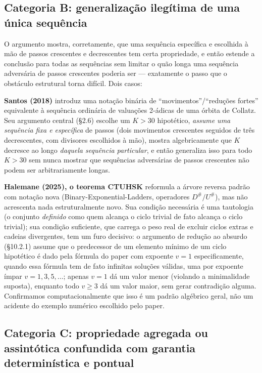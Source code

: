 \documentclass[11pt]{article}
\begin{document}
\subsection{Categoria B: generalização ilegítima de uma única sequência}
\label{sec:catB}

O argumento mostra, corretamente, que uma sequência específica e
escolhida à mão de passos crescentes e decrescentes tem certa
propriedade, e então estende a conclusão para todas as sequências sem
limitar o quão longa uma sequência adversária de passos crescentes
poderia ser --- exatamente o passo que o obstáculo estrutural torna
difícil. Dois casos:

\textbf{Santos (2018)} \cite{Santos2018} introduz uma notação binária de
``movimentos''/``reduções fortes'' equivalente à sequência ordinária de
valuações 2-ádicas de uma órbita de Collatz. Seu argumento central
(\S2.6) escolhe um $K>30$ hipotético, \emph{assume uma sequência fixa e
específica} de passos (dois movimentos crescentes seguidos de três
decrescentes, com divisores escolhidos à mão), mostra algebricamente
que $K$ decresce ao longo \emph{daquela sequência particular}, e então
generaliza isso para todo $K>30$ sem nunca mostrar que sequências
adversárias de passos crescentes não podem ser arbitrariamente longas.

\textbf{Halemane (2025), o teorema CTUHSK} \cite{Halemane2025}
reformula a árvore reversa padrão com notação nova
(Binary-Exponential-Ladders, operadores $D^\#/U^\#$), mas não acrescenta
nada estruturalmente novo. Sua condição necessária é uma tautologia (o
conjunto \emph{definido} como quem alcança o ciclo trivial de fato
alcança o ciclo trivial); sua condição suficiente, que carrega o peso
real de excluir ciclos extras e cadeias divergentes, tem um furo
decisivo: o argumento de redução ao absurdo (\S10.2.1) assume que o
predecessor de um elemento mínimo de um ciclo hipotético é dado pela
fórmula do paper com expoente $v=1$ especificamente, quando essa
fórmula tem de fato infinitas soluções válidas, uma por expoente ímpar
$v=1,3,5,\dots$; apenas $v=1$ dá um valor menor (violando a
minimalidade suposta), enquanto todo $v\ge 3$ dá um valor maior, sem
gerar contradição alguma. Confirmamos computacionalmente que isso é um
padrão algébrico geral, não um acidente do exemplo numérico escolhido
pelo paper.

\subsection{Categoria C: propriedade agregada ou assintótica confundida com garantia determinística e pontual}
\label{sec:catC}
\end{document}
